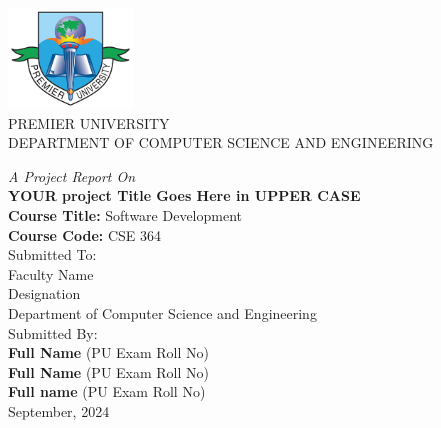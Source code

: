
\thispagestyle{empty} %



{
	\thispagestyle{empty}
	\centering
	\normalsize
	  
        \includegraphics[width=1.3in]{Images/PUClogo.png}\\

	{PREMIER UNIVERSITY}\\
	{DEPARTMENT OF COMPUTER SCIENCE AND ENGINEERING}\\
	{\textit{A Project Report On}\\
	{\bf YOUR project Title Goes Here in UPPER CASE}\\[1.5cm]

     {\bf Course Title:} Software Development\\
     {\bf Course Code:}  CSE 364\\[1.5cm]

        Submitted To:\\
	   Faculty Name \\
          Designation \\
          Department of Computer Science and Engineering\\[1.5cm]
    
	
	Submitted By:\\
	{\bf Full Name} (PU Exam Roll No)\\
        {\bf Full Name} (PU Exam Roll No)\\
	{\bf Full name} (PU Exam Roll No)\\[3.5cm]
	
	September, 2024
	
}

}

